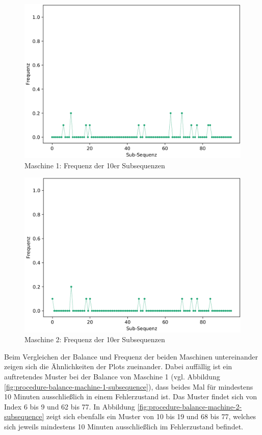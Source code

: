 \begin{figure}[H]
	\centering
	\includegraphics[scale=0.20]{images/procedure/frequency_machine_1}
	\caption{Maschine 1: Frequenz der 10er Subsequenzen}
	\label{fig:procedure-frequency-machine-1-subsequence}
\end{figure}

\begin{figure}[H]
	\centering
	\includegraphics[scale=0.20]{images/procedure/frequency_machine_2}
	\caption{Maschine 2: Frequenz der 10er Subsequenzen}
	\label{fig:procedure-frequency-machine-2-subsequence}
\end{figure}

Beim Vergleichen der Balance und Frequenz der beiden Maschinen untereinander zeigen sich die Ähnlichkeiten der Plots zueinander. Dabei auffällig ist ein auftretendes Muster bei der Balance von Maschine 1 (vgl. Abbildung \ref{fig:procedure-balance-machine-1-subsequence}), dass beides Mal für mindestens 10 Minuten ausschließlich in einem Fehlerzustand ist. Das Muster findet sich von Index 6 bis 9 und 62 bis 77. In Abbildung \ref{fig:procedure-balance-machine-2-subsequence} zeigt sich ebenfalls ein Muster von 10 bis 19 und 68 bis 77, welches sich jeweils mindestens 10 Minuten ausschließlich im Fehlerzustand befindet.

